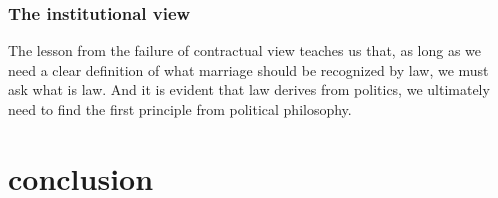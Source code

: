 \documentclass{article}
\begin{document}
\subsubsection{The institutional view}

The lesson from the failure of contractual view teaches us that, as long as we need a clear definition of what marriage should be recognized by law, we must ask what is law. And it is evident that law derives from politics, we ultimately need to find the first principle from political philosophy. 

\section{conclusion}


\printbibliography{}
\end{document}
